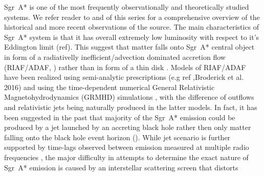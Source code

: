 Sgr~A* is one of the most frequently observationally and theoretically studied systems.  We refer reader to  and  of this series for a comprehensive overview of the historical and more recent observations of the source. The main characteristics of Sgr~A* system is that it has overall extremely low luminosity with respect to it's Eddington limit (ref). This suggest that matter falls onto Sgr~A* central object in form of a radiativelly inefficient/advection dominated accretion flow (RIAF/ADAF, \citealt{1977ApJ...214..840I,1994ApJ...428L..13N, 1995ApJ...444..231N,
  1995ApJ...452..710N, 1996A&AS..120C.287N, 1998ApJ...492..554N}) rather than in form of a thin disk \citep{1973A&A....24..337S}. Models of RIAF/ADAF have been realized using semi-analytic prescriptions (e.g ref ,Broderick et al. 2016) and using the time-dependent numerical General Relativistic Magnetohydrodynamics (GRMHD) simulations \citep[e.g.,][]{2000ApJ...528..462H, 2003ApJ...589..458D,
  2003ApJ...589..444G, 2007CQGra..24S.235G, 2012ApJS..201....9F,
  2014ApJ...796...22F, 2016ApJS..225...22W, 2017ApJS..231...17A,
  2018JPhCS1031a2008O, 2019A&A...629A..61O, 2019ApJS..243...26P}, with the difference of outflows and
relativistic jets being naturally produced in the latter models. In fact, it has been suggested in the past that majority of the Sgr~A* emission could be produced by a jet launched by an accreting black hole rather then only matter falling onto the black hole event horizon (\citealt{2000A&A...362..113F,2004A&A...414..895F, 2005ApJ...635.1203M, 2013A&A...559L...3M}). While jet scenario is further supported by time-lags observed between emission measured at multiple radio frequencies \citep{2015A&A...576A..41B,2021arXiv210713402B}, the major difficulty in attempts to determine the exact nature of Sgr~A* emission is caused by an interstellar scattering screen that distorts 
